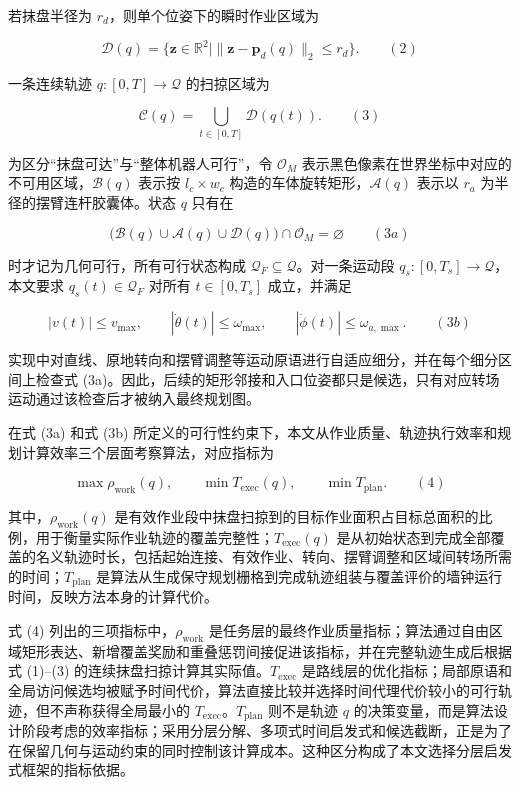   

若抹盘半径为 $r_d$，则单个位姿下的瞬时作业区域为

  

$$
\mathcal D(q)=
\{\mathbf z\in\mathbb R^2\mid
\|\mathbf z-\mathbf p_d(q)\|_2\le r_d\}.
\qquad(2)
$$

  

一条连续轨迹 $q:[0,T]\rightarrow\mathcal Q$ 的扫掠区域为

  

$$
\mathcal C(q)=\bigcup_{t\in[0,T]}\mathcal D(q(t)).
\qquad(3)
$$

为区分“抹盘可达”与“整体机器人可行”，令 $\mathcal O_M$ 表示黑色像素在世界坐标中对应的不可用区域，$\mathcal B(q)$ 表示按 $l_c\times w_c$ 构造的车体旋转矩形，$\mathcal A(q)$ 表示以 $r_a$ 为半径的摆臂连杆胶囊体。状态 $q$ 只有在

$$
\bigl(\mathcal B(q)\cup\mathcal A(q)\cup\mathcal D(q)\bigr)
\cap\mathcal O_M=\varnothing
\qquad(3a)
$$

时才记为几何可行，所有可行状态构成 $\mathcal Q_F\subseteq\mathcal Q$。对一条运动段 $q_s:[0,T_s]\rightarrow\mathcal Q$，本文要求 $q_s(t)\in\mathcal Q_F$ 对所有 $t\in[0,T_s]$ 成立，并满足

$$
|v(t)|\le v_{\max},\qquad
|\dot\theta(t)|\le\omega_{\max},\qquad
|\dot\phi(t)|\le\omega_{a,\max}.
\qquad(3b)
$$

实现中对直线、原地转向和摆臂调整等运动原语进行自适应细分，并在每个细分区间上检查式 (3a)。因此，后续的矩形邻接和入口位姿都只是候选，只有对应转场运动通过该检查后才被纳入最终规划图。

  

在式 (3a) 和式 (3b) 所定义的可行性约束下，本文从作业质量、轨迹执行效率和规划计算效率三个层面考察算法，对应指标为

  

$$
\max \rho_{\mathrm{work}}(q),\qquad
\min T_{\mathrm{exec}}(q),\qquad
\min T_{\mathrm{plan}}.
\qquad(4)
$$

  

其中，$\rho_{\mathrm{work}}(q)$ 是有效作业段中抹盘扫掠到的目标作业面积占目标总面积的比例，用于衡量实际作业轨迹的覆盖完整性；$T_{\mathrm{exec}}(q)$ 是从初始状态到完成全部覆盖的名义轨迹时长，包括起始连接、有效作业、转向、摆臂调整和区域间转场所需的时间；$T_{\mathrm{plan}}$ 是算法从生成保守规划栅格到完成轨迹组装与覆盖评价的墙钟运行时间，反映方法本身的计算代价。

式 (4) 列出的三项指标中，$\rho_{\mathrm{work}}$ 是任务层的最终作业质量指标；算法通过自由区域矩形表达、新增覆盖奖励和重叠惩罚间接促进该指标，并在完整轨迹生成后根据式 (1)–(3) 的连续抹盘扫掠计算其实际值。$T_{\mathrm{exec}}$ 是路线层的优化指标；局部原语和全局访问候选均被赋予时间代价，算法直接比较并选择时间代理代价较小的可行轨迹，但不声称获得全局最小的 $T_{\mathrm{exec}}$。$T_{\mathrm{plan}}$ 则不是轨迹 $q$ 的决策变量，而是算法设计阶段考虑的效率指标；采用分层分解、多项式时间启发式和候选截断，正是为了在保留几何与运动约束的同时控制该计算成本。这种区分构成了本文选择分层启发式框架的指标依据。

